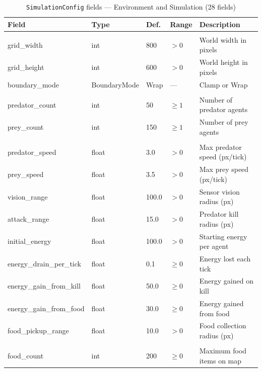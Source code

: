\begin{table}[H]
\centering
\scriptsize
\caption{\texttt{SimulationConfig} fields — Environment and Simulation (28 fields)}
\label{tab:config1}
\begin{tabularx}{\textwidth}{@{}>{\ttfamily\scriptsize}p{4.4cm}>{\ttfamily\scriptsize}p{2.2cm}>{\scriptsize}p{0.8cm}>{\scriptsize}p{1.0cm}>{\scriptsize\RaggedRight}X@{}}
\toprule
\textbf{Field} & \textbf{Type} & \textbf{Def.} & \textbf{Range} & \textbf{Description} \\
\midrule
\multicolumn{5}{@{}l}{\textit{Environment}} \\
grid\_width            & int    & 800    & $>0$    & World width in pixels \\
grid\_height           & int    & 600    & $>0$    & World height in pixels \\
boundary\_mode         & BoundaryMode & Wrap & —   & Clamp or Wrap \\
\midrule
\multicolumn{5}{@{}l}{\textit{Population}} \\
predator\_count        & int    & 50     & $\ge 1$ & Number of predator agents \\
prey\_count            & int    & 150    & $\ge 1$ & Number of prey agents \\
\midrule
\multicolumn{5}{@{}l}{\textit{Agent}} \\
predator\_speed        & float  & 3.0    & $>0$    & Max predator speed (px/tick) \\
prey\_speed            & float  & 3.5    & $>0$    & Max prey speed (px/tick) \\
vision\_range          & float  & 100.0  & $>0$    & Sensor vision radius (px) \\
attack\_range          & float  & 15.0   & $>0$    & Predator kill radius (px) \\
initial\_energy        & float  & 100.0  & $>0$    & Starting energy per agent \\
energy\_drain\_per\_tick& float  & 0.1    & $\ge 0$ & Energy lost each tick \\
energy\_gain\_from\_kill& float  & 50.0   & $\ge 0$ & Energy gained on kill \\
energy\_gain\_from\_food& float  & 30.0   & $\ge 0$ & Energy gained from food \\
food\_pickup\_range    & float  & 10.0   & $>0$    & Food collection radius (px) \\
\midrule
\multicolumn{5}{@{}l}{\textit{Food}} \\
food\_count            & int    & 200    & $\ge 0$ & Maximum food items on map \\

\end{tabularx}
\end{table}

